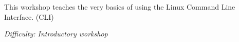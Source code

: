 %
%
%

\newif\ifprint
\printfalse



\newcommand{\workshopTitle}{Workshop 12: The Linux Command Line}

\newcommand{\workshopAuthor}{Jack Kelly}



	
	
	This workshop teaches the very basics of using the Linux Command Line Interface. (CLI)
	
	\textit{Difficulty: Introductory workshop}
	
	\ifprint
	\renewcommand{\baselinestretch}{0.75}\normalsize
	\tableofcontents
	\renewcommand{\baselinestretch}{1.0}\normalsize
	\else
	\tableofcontents
	\fi
	
	
	
		\clearpage
	
		\webclearpage
	
		\webclearpage
	
	
		\webclearpage
	


